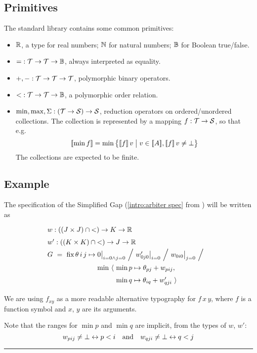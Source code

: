 \subsection{Primitives}

The standard library contains some common primitives:

\begin{itemize}
  \item $\mathbb{R}$, a type for real numbers; $\mathbb{N}$ for natural numbers; $\mathbb{B}$ for Boolean true/false.
  \item ${=} : \mathcal{T}\to\mathcal{T}\to\mathbb{B}$, always interpreted as equality.
  \item ${+}, {-} : \mathcal{T}\to\mathcal{T}\to\mathcal{T}$, polymorphic binary operators.
  \item ${<} : \mathcal{T}\to\mathcal{T}\to\mathbb{B}$, a polymorphic order relation.
  \item $\min, \max, \Sigma : (\mathcal{T}\to\mathcal{S})\to\mathcal{S}$, reduction operators
    on ordered/unordered collections. The collection is represented by a mapping $f : \mathcal{T}\to\mathcal{S}$,
    so that e.g. \[\semp{\min f} = \min \big\{\semp{f}\,v \;\big|\; v\in\semp{A}, \semp{f}\,v\neq\bot\big\}\]
    The collections are expected to be finite.
\end{itemize}

\subsection{Example \hrulefill}

The specification of the Simplified Gap (\eqref{intro:arbiter spec} from ) will be written as
%
\begin{equation}
  \renewcommand\arraystretch{1.5}
  \begin{array}{@{}l@{}l@{}l@{}}
    \lspan3{w : ((J\times J)\cap{<})\to K\to\R} \\
    \lspan3{w' : ((K\times K)\cap{<})\to J\to\R} \\
    G ~=~ \fix \theta\,i\,j\mapsto{}
      & \lspan2{0\big|_{i=0\land j=0} ~\Big/~ w'_{0j0}\big|_{i=0} ~\Big/~ w_{0i0}\big|_{j=0} ~\Big/~} \\
      & \min~\langle~ & \min p\mapsto\theta_{pj}+w_{pij}, \\
      & & \min q\mapsto\theta_{iq}+w'_{qji} ~\rangle
  \end{array}
  \label{lang:arbiter spec}
\end{equation}

\medskip
We are using $f_{xy}$
as a more readable alternative typography for $f\,x\,y$,
where $f$ is a function symbol and $x$, $y$ are its arguments.

Note that the ranges for $\min p$ and $\min q$ are implicit, from the types of
$w$, $w'$: \[w_{pij}\neq\bot\leftrightarrow p<i \quad \mbox{and} \quad w_{qji}\neq\bot\leftrightarrow q<j\]

\medskip
\hrule
